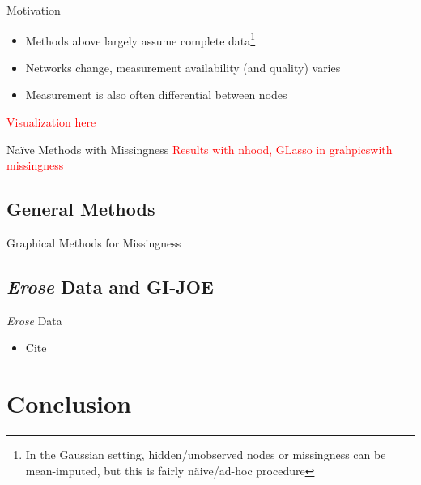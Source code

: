 \documentclass{beamer}
\begin{document}
\begin{frame}{Motivation}
    \begin{itemize}
        \item Methods above largely assume complete data\footnote{In the Gaussian setting, hidden/unobserved nodes or missingness can be mean-imputed, but this is fairly n\"aive/ad-hoc procedure}
        \item Networks change, measurement availability (and quality) varies
        \item Measurement is also often differential between nodes 
    \end{itemize}
    \textcolor{red}{Visualization here}
\end{frame}

\begin{frame}{Na\"ive Methods with Missingness}
    \textcolor{red}{Results with nhood, GLasso in grahpicswith missingness}
\end{frame}

\subsection{General Methods}

\begin{frame}{Graphical Methods for Missingness}
\end{frame}

\subsection{{\it Erose} Data and GI-JOE}



\begin{frame}{{\it Erose} Data}
    \begin{itemize}
        \item Cite \cite{zheng_gi-joe_2023}
    \end{itemize} 
\end{frame}


\begin{frame}{}
\end{frame}


\section*{Conclusion}
\end{document}
